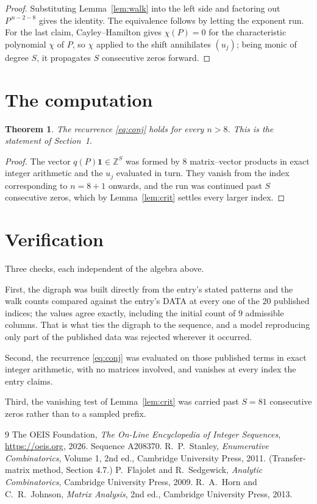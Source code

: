 \documentclass[11pt,a4paper]{article}
\theoremstyle{plain}
\newtheorem{theorem}{Theorem}
\theoremstyle{definition}
\begin{document}
\begin{proof}
Substituting Lemma~\ref{lem:walk} into the left side and factoring out
$P^{\,n-2-8}$ gives the identity. The equivalence follows by letting the exponent
run. For the last claim, Cayley--Hamilton gives $\chi(P)=0$ for the characteristic
polynomial $\chi$ of $P$, so $\chi$ applied to the shift annihilates $(u_j)$; being monic of
degree $S$, it propagates $S$ consecutive zeros forward.
\end{proof}

\section{The computation}

\begin{theorem}
The recurrence \eqref{eq:conj} holds for every $n>8$. This is the statement of
Section~1.
\end{theorem}

\begin{proof}
The vector $q(P)\mathbf{1}\in\mathbb{Z}^{S}$ was formed by $8$ matrix--vector
products in exact integer arithmetic and the $u_j$ evaluated in turn. They vanish from the
index corresponding to $n=8+1$ onwards, and the run was continued past $S$ consecutive
zeros, which by Lemma~\ref{lem:crit} settles every larger index.
\end{proof}

\section{Verification}

Three checks, each independent of the algebra above.

First, the digraph was built directly from the entry's stated patterns and the walk counts
compared against the entry's DATA at every one of the $20$ published indices; the
values agree exactly, including the initial count of $9$ admissible columns. That is
what ties the digraph to the sequence, and a model reproducing only part of the published
data was rejected wherever it occurred.

Second, the recurrence \eqref{eq:conj} was evaluated on those published terms in exact
integer arithmetic, with no matrices involved, and vanishes at every index the entry claims.

Third, the vanishing test of Lemma~\ref{lem:crit} was carried past $S=81$ consecutive
zeros rather than to a sampled prefix.

\begin{thebibliography}{9}
 The OEIS Foundation, \emph{The On-Line Encyclopedia of Integer
Sequences}, \url{https://oeis.org}, 2026. Sequence A208370.
 R.~P.~Stanley, \emph{Enumerative Combinatorics}, Volume 1, 2nd ed.,
Cambridge University Press, 2011. (Transfer-matrix method, Section 4.7.)
 P.~Flajolet and R.~Sedgewick, \emph{Analytic Combinatorics}, Cambridge
University Press, 2009.
 R.~A.~Horn and C.~R.~Johnson, \emph{Matrix Analysis}, 2nd ed., Cambridge
University Press, 2013.
\end{thebibliography}
\end{document}
